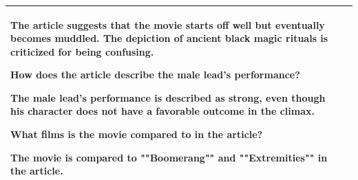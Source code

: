 \begin{table}[h!]
\begin{tabular}{p{} p{}}
The article suggests that the movie starts off well but eventually becomes muddled. The depiction of ancient black magic rituals is criticized for being confusing.

How does the article describe the male lead's performance?

The male lead's performance is described as strong, even though his character does not have a favorable outcome in the climax.

What films is the movie compared to in the article?

The movie is compared to ""Boomerang"" and ""Extremities"" in the article. 
\\






















































        \bottomrule
    \end{tabular}
\end{table}


